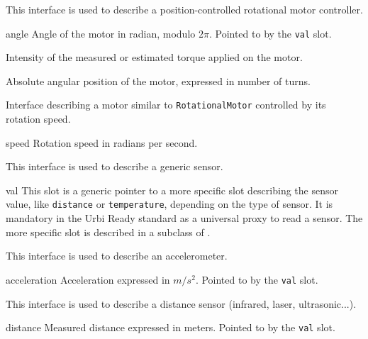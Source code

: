 This interface is used to describe a position-controlled rotational motor
controller.

\begin{urbiscriptapi}
\item[angle] Angle of the motor in radian, modulo $2\pi$. Pointed to by the
  \lstinline{val} slot.


\item[torque] Intensity of the measured or estimated torque applied on the
  motor.


\item[turn] Absolute angular position of the motor, expressed in number of
  turns.
\end{urbiscriptapi}


Interface describing a motor similar to \lstinline{RotationalMotor}
controlled by its rotation speed.

\begin{urbiscriptapi}
\item[speed] Rotation speed in radians per second.
\end{urbiscriptapi}


This interface is used to describe a generic sensor.

\begin{urbiscriptapi}
\item[val] This slot is a generic pointer to a more specific slot describing
  the sensor value, like \lstinline{distance} or \lstinline{temperature},
  depending on the type of sensor. It is mandatory in the Urbi Ready
  standard as a universal proxy to read a sensor. The more specific slot is
  described in a subclass of .
\end{urbiscriptapi}


This interface is used to describe an accelerometer.

\begin{urbiscriptapi}
\item[acceleration] Acceleration expressed in $m/s^2$.  Pointed to by the
  \lstinline{val} slot.
\end{urbiscriptapi}


This interface is used to describe a distance sensor (infrared, laser,
ultrasonic...).

\begin{urbiscriptapi}
\item[distance] Measured distance expressed in meters.  Pointed to by the
  \lstinline{val} slot.
\end{urbiscriptapi}


